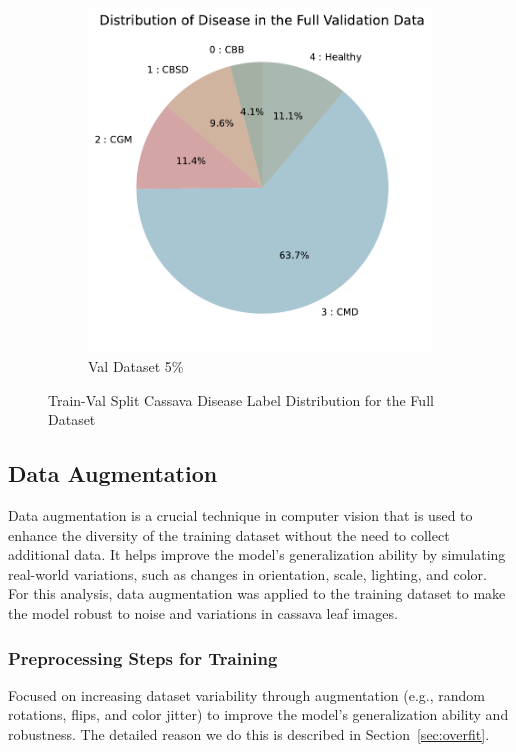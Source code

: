 \begin{figure}[t]
\begin{subfigure}{0.4\textwidth}
        \includegraphics[width=\linewidth]{graphs/overview/Distribution of Disease in the Full Validation Data.pdf}
        \caption{Val Dataset 5\%}
        \label{fig:ImbalancedVal}
    \end{subfigure}
    \caption{Train-Val Split Cassava Disease Label Distribution for the Full Dataset}
    \label{fig:TrainValSplit}
\end{figure} 



\subsection{Data Augmentation}

Data augmentation is a crucial technique in computer vision that is used to enhance the diversity of the training dataset without the need to collect additional data. It helps improve the model's generalization ability by simulating real-world variations, such as changes in orientation, scale, lighting, and color. For this analysis, data augmentation was applied to the training dataset to make the model robust to noise and variations in cassava leaf images.

\subsubsection{Preprocessing Steps for Training}\label{sec:pre_image}
Focused on increasing dataset variability through augmentation (e.g., random rotations, flips, and color jitter) to improve the model's generalization ability and robustness. The detailed reason we do this is described in Section~\ref{sec:overfit}.

